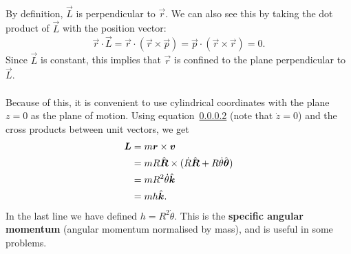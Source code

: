 \documentclass[../classical_mechanics.tex]{subfiles}
\begin{document}
        \paragraph{}
        By definition, $\vec{L}$ is perpendicular to $\vec{r}$.
        We can also see this by taking the dot product of $\vec{L}$ with the position vector:
        \begin{equation}
            \vec{r}\cdot\vec{L}=\vec{r}\cdot(\vec{r}\times\vec{p})=\vec{p}\cdot(\vec{r}\times\vec{r})=0.
        \end{equation}
        Since $\vec{L}$ is constant, this implies that $\vec{r}$ is confined to the plane perpendicular to $\vec{L}$.
        
        \paragraph{}
        Because of this, it is convenient to use cylindrical coordinates with the plane $z=0$ as the plane of motion.
        Using equation~\ref{} (note that $\dot{z}=0$) and the cross products between unit vectors, we get
        \begin{align}
            \boldsymbol{L}&=m\boldsymbol{r}\times\boldsymbol{v}\\
            &=mR\hat{\boldsymbol{R}}\times(\dot{R}\hat{\boldsymbol{R}}+R\dot{\theta}\hat{\boldsymbol{\theta}})\\
            &=mR^2\dot{\theta}\hat{\boldsymbol{k}}\label{eq:angular-momentum-theta-dot}\\
            &=mh\hat{\boldsymbol{k}}.
        \end{align}
        In the last line we have defined $h=R^2\dot{\theta}$.
        This is the \textbf{specific angular momentum} (angular momentum normalised by mass), and is useful in some problems.
\end{document}
